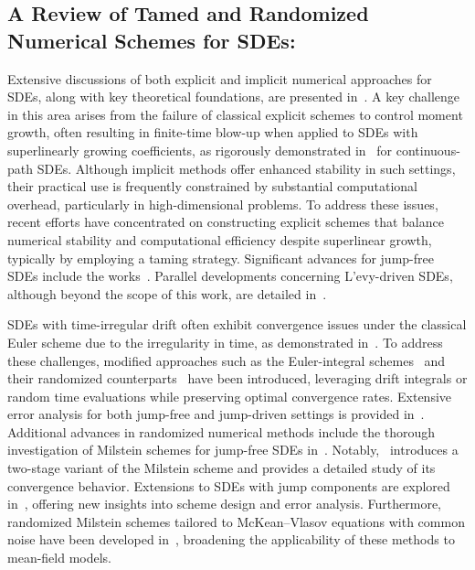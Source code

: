 \documentclass[reqno,  oneside, 12pt]{amsart}
\begin{document}
\subsection*{A Review of Tamed and Randomized Numerical Schemes for SDEs:}
Extensive discussions of both explicit and implicit numerical approaches for SDEs, along with key theoretical foundations, are presented in~\cite{Situ2006}.
A key challenge in this area arises from the failure of classical explicit schemes to control moment growth, often resulting in finite-time blow-up when applied to SDEs with superlinearly growing coefficients, as rigorously demonstrated in~\cite{hutzenthaler2010} for continuous-path SDEs. Although implicit methods offer enhanced stability in such settings, their practical use is frequently constrained by substantial computational overhead, particularly in high-dimensional problems.
To address these issues, recent efforts have concentrated on constructing explicit schemes that balance numerical stability and computational efficiency despite superlinear growth, typically by employing a taming strategy. Significant advances for jump-free SDEs include the works~\cite{hutzenthaler2015, hutzenthaler2020,hutzenthaler2012, Kumar2020, Sabanis2013, Sabanis2016, Tretyakov2013}. Parallel developments concerning L'evy-driven SDEs, although beyond the scope of this work, are detailed in~\cite{Chen2019, Dareiotis2016, Kumar2021a,Kumar2017a, Kumar2017}.

SDEs with time-irregular drift often exhibit convergence issues under the classical Euler scheme due to the irregularity in time, as demonstrated in~\cite[Section~3]{Przybylowicz2014}. 
To address these challenges, modified approaches such as the Euler-integral schemes~\cite{Dareiotis2016, Kumar2017a} and their randomized counterparts~\cite{Przybylowicz2014} have been introduced, leveraging drift integrals or random time evaluations while preserving optimal convergence rates. Extensive error analysis for both jump-free and jump-driven settings is provided in~\cite{Przybylowicz2015a, Przybylowicz2015b, Przybylowicz2022}.
Additional advances in randomized numerical methods include the thorough investigation of Milstein schemes for jump-free SDEs in~\cite{Kruse2019, Pawel2021}. Notably,~\cite{Kruse2019} introduces a two-stage variant of the Milstein scheme and provides a detailed study of its convergence behavior. Extensions to SDEs with jump components are explored in~\cite{Verena2024}, offering new insights into scheme design and error analysis. Furthermore, randomized Milstein schemes tailored to McKean--Vlasov equations with common noise have been developed in~\cite{Biswas2022}, broadening the applicability of these methods to mean-field models.
\end{document}
